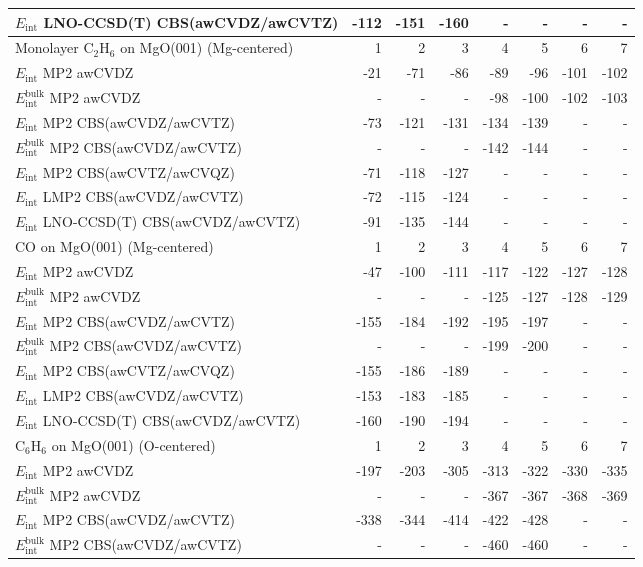 \begin{longtable}{lrrrrrrr}
$E_\text{int}$ LNO-CCSD(T) CBS(awCVDZ/awCVTZ) & -112 & -151 & -160 & - & - & - & - \\
\toprule
Monolayer C$_2$H$_6$ on MgO(001) (Mg-centered) & 1 & 2 & 3 & 4 & 5 & 6 & 7 \\ 
\midrule
$E_\text{int}$ MP2 awCVDZ & -21 & -71 & -86 & -89 & -96 & -101 & -102 \\
$E_\text{int}^\text{bulk}$ MP2 awCVDZ & - & - & - & -98 & -100 & -102 & -103 \\
$E_\text{int}$ MP2 CBS(awCVDZ/awCVTZ) & -73 & -121 & -131 & -134 & -139 & - & - \\
$E_\text{int}^\text{bulk}$ MP2 CBS(awCVDZ/awCVTZ) & - & - & - & -142 & -144 & - & - \\
$E_\text{int}$ MP2 CBS(awCVTZ/awCVQZ) & -71 & -118 & -127 & - & - & - & - \\
$E_\text{int}$ LMP2 CBS(awCVDZ/awCVTZ) & -72 & -115 & -124 & - & - & - & - \\
$E_\text{int}$ LNO-CCSD(T) CBS(awCVDZ/awCVTZ) & -91 & -135 & -144 & - & - & - & - \\
\toprule
CO on MgO(001) (Mg-centered) & 1 & 2 & 3 & 4 & 5 & 6 & 7 \\ 
\midrule
$E_\text{int}$ MP2 awCVDZ & -47 & -100 & -111 & -117 & -122 & -127 & -128 \\
$E_\text{int}^\text{bulk}$ MP2 awCVDZ & - & - & - & -125 & -127 & -128 & -129 \\
$E_\text{int}$ MP2 CBS(awCVDZ/awCVTZ) & -155 & -184 & -192 & -195 & -197 & - & - \\
$E_\text{int}^\text{bulk}$ MP2 CBS(awCVDZ/awCVTZ) & - & - & - & -199 & -200 & - & - \\
$E_\text{int}$ MP2 CBS(awCVTZ/awCVQZ) & -155 & -186 & -189 & - & - & - & - \\
$E_\text{int}$ LMP2 CBS(awCVDZ/awCVTZ) & -153 & -183 & -185 & - & - & - & - \\
$E_\text{int}$ LNO-CCSD(T) CBS(awCVDZ/awCVTZ) & -160 & -190 & -194 & - & - & - & - \\
\toprule
C$_6$H$_6$ on MgO(001) (O-centered) & 1 & 2 & 3 & 4 & 5 & 6 & 7 \\ 
\midrule
$E_\text{int}$ MP2 awCVDZ & -197 & -203 & -305 & -313 & -322 & -330 & -335 \\
$E_\text{int}^\text{bulk}$ MP2 awCVDZ & - & - & - & -367 & -367 & -368 & -369 \\
$E_\text{int}$ MP2 CBS(awCVDZ/awCVTZ) & -338 & -344 & -414 & -422 & -428 & - & - \\
$E_\text{int}^\text{bulk}$ MP2 CBS(awCVDZ/awCVTZ) & - & - & - & -460 & -460 & - & - \\

\end{longtable}
